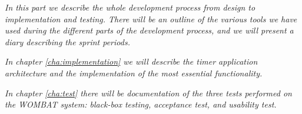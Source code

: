 \textit{In this part we describe the whole development process from design to implementation and testing. 
There will be an outline of the various tools we have used during the different parts of the development process, and we will present a diary describing the sprint periods.}

\textit{In chapter \ref{cha:implementation} we will describe the timer application architecture and the implementation of the most essential functionality.}

\textit{In chapter \ref{cha:test} there will be documentation of the three tests performed on the WOMBAT system: black-box testing, acceptance test, and usability test.}
